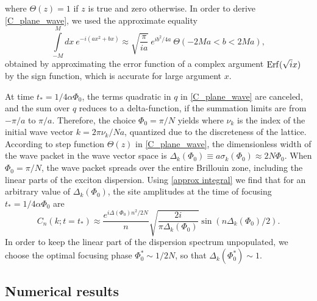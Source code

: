 %
where $\Theta(z) = 1$ if $z$ is true and zero otherwise.
In order to derive \autoref{C_plane_wave}, we
used the approximate equality
\begin{equation}\label{approx integral}
\int\limits_{-M}^M dx\ e^{-i(ax^2 + b x)} \approx
\sqrt{\frac{\pi}{ia}}\ e^{i b^2/4a}\  \Theta(-2Ma < b < 2Ma),
\end{equation}
obtained by approximating the error function of a complex argument
${\rm Erf}(\sqrt{i}x)$ by the sign function, which is accurate for
large argument $x$.

At time $t_* = 1/4\alpha\Phi_0$, the terms quadratic in $q$
in \autoref{C_plane_wave} are canceled, and the sum over $q$ reduces to a
delta-function, if the summation limits are from $-\pi/a$ to
$\pi/a$. Therefore, the choice $\Phi_0 = \pi / N$ yields 
where   $\nu_k$
is the index of the initial wave vector $k = 2\pi \nu_k / Na$, quantized due to the discreteness of the lattice.
According to step function  $\Theta(z)$ in \autoref{C_plane_wave}, the dimensionless width
of the wave packet in the wave vector space is $\Delta_k(\Phi_0)
\equiv a\sigma_{k}(\Phi_0) \approx 2N\Phi_0$. When $\Phi_0 = \pi /
N$, the wave packet spreads over the entire Brillouin zone, including the
linear parts of the exciton dispersion.
Using \autoref{approx integral} we find that for an arbitrary
value of $\Delta_{k}(\Phi_0)$, the site amplitudes at the time of
focusing $t_* = 1/4\alpha\Phi_0$ are
\begin{equation}
C_n(k; t=t_*) \approx \frac{e^{i\Delta(\Phi_0) n^2/2N}}{n}
\sqrt{\frac{2i}{\pi \Delta_{k}(\Phi_0)}} \sin (n
\Delta_{k}(\Phi_0) /2). \label{x-focusing-PlaneWave}
\end{equation}
%
In order to keep the linear part of the dispersion spectrum
unpopulated, we choose the optimal focusing phase $\Phi_0^*
\sim 1 /2N$, so that $\Delta_{k}( \Phi_0^*)\sim 1$.



\subsection{Numerical results}
\label{sec:focusingNumerical}

